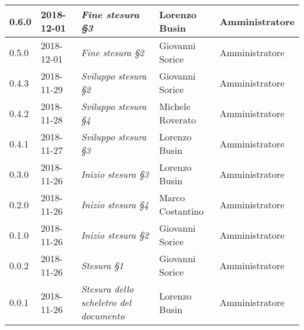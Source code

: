 \begin{longtable}{C{2cm}|C{2.5cm}|C{4.5cm}|C{2.5cm}|C{3cm}}
		0.6.0 & 2018-12-01 & \emph{Fine stesura §3} & Lorenzo Busin & Amministratore  \\
		\hline
		
	 	0.5.0 & 2018-12-01 & \emph{Fine stesura §2} & Giovanni Sorice & Amministratore  \\
		\hline
		
		0.4.3 & 2018-11-29 & \emph{Sviluppo stesura §2} & Giovanni Sorice & Amministratore  \\
		\hline
		
		0.4.2 & 2018-11-28 & \emph{Sviluppo stesura §4} & Michele Roverato & Amministratore  \\
		\hline
		
		 0.4.1 & 2018-11-27 &\emph{Sviluppo stesura §3} & Lorenzo Busin & Amministratore \\
		\hline
		
		0.3.0 & 2018-11-26 & \emph{Inizio stesura §3} & Lorenzo Busin & Amministratore  \\
		\hline
		
		0.2.0 & 2018-11-26 & \emph{Inizio stesura §4} & Marco Costantino & Amministratore  \\
		\hline
		
		0.1.0 & 2018-11-26 & \emph{Inizio stesura §2} & Giovanni Sorice & Amministratore \\
		\hline
		
		0.0.2 & 2018-11-26 & \emph{Stesura §1} & Giovanni Sorice & Amministratore  \\
		\hline
		
		0.0.1 & 2018-11-26 & \emph{Stesura dello scheletro del documento} & Lorenzo Busin & Amministratore \\
	
	
\end{longtable}


\clearpage